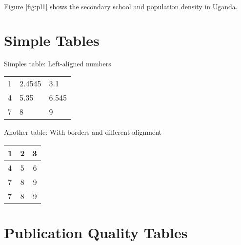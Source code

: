 \documentclass[a4paper, 14pt]{article}
\begin{document}
Figure \ref{fig:pl1} shows the secondary school and population density in Uganda. 

\newpage %
\section{Simple Tables}

Simples table: Left-aligned numbers
\begin{center} %
\begin{tabular}{lll} %
1 & 2.4545 & 3.1\\
4 & 5.35 & 6.545\\
7 & 8 & 9\\
\end{tabular}
\end{center}

Another table: With borders and different alignment
\begin{center}%
\begin{tabular}{|l|c|r|} \hline
1 & 2 & 3\\ \hline
4 & 5 & 6\\
7 & 8 & 9 \\
7 & 8 & 9 \\ \hline
\end{tabular}
\end{center}

\newpage %
\section{Publication Quality Tables}
\end{document}
